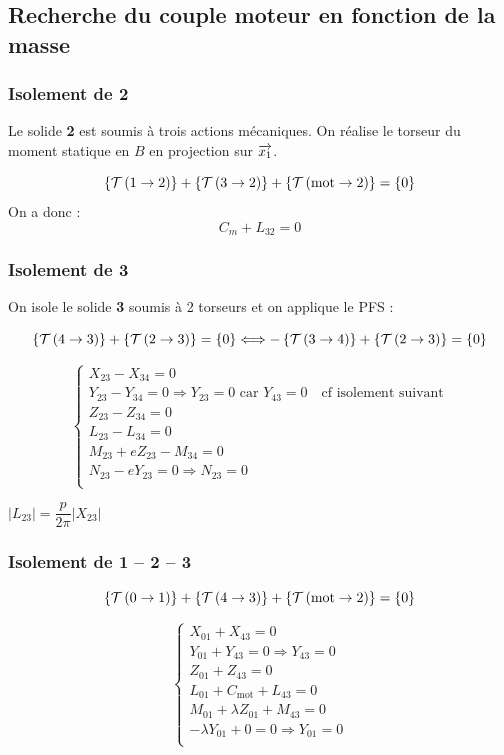 \documentclass[10pt,fleqn]{article} %
\begin{document}
\subsection{Recherche du couple moteur en fonction de la masse}
\subsubsection*{Isolement de 2}
Le solide \textbf{2} est soumis à trois actions mécaniques. On réalise le torseur du moment statique en $B$ en projection sur $\overrightarrow{x_1}$. 

$$
\left\{\mathcal{T} \left(1\rightarrow 2 \right) \right\} + \left\{\mathcal{T} \left(3\rightarrow 2 \right) \right\} + \left\{\mathcal{T} \left(\text{mot}\rightarrow 2 \right) \right\}  =\{0\} 
$$
On a donc : 
$$
C_m + L_{32}=0
$$





\subsubsection*{Isolement de 3}
On isole le solide \textbf{3} soumis à 2 torseurs et on applique le PFS :

$$
\left\{\mathcal{T} \left(4\rightarrow 3 \right) \right\} + \left\{\mathcal{T} \left(2\rightarrow 3 \right) \right\} =\{0\} \Longleftrightarrow 
-\left\{\mathcal{T} \left(3\rightarrow 4 \right) \right\} + \left\{\mathcal{T} \left(2\rightarrow 3 \right) \right\} =\{0\} 
$$

$$
\left\{
\begin{array}{l}
X_{23} - X_{34}=0\\
Y_{23} - Y_{34}=0 \Rightarrow  Y_{23} = 0 \text{ car } Y_{43} = 0 \quad \text{cf isolement suivant}\\
Z_{23} - Z_{34}=0\\
L_{23} - L_{34}=0\\
M_{23}+eZ_{23} - M_{34} =0\\
N_{23}-eY_{23} =0 \Rightarrow  N_{23} = 0 \\
\end{array}
\right.
$$

$|L_{23}|=\dfrac{p}{2\pi}|X_{23}|$


\subsubsection*{Isolement de 1 -- 2 -- 3}

$$
\left\{\mathcal{T} \left(0\rightarrow 1 \right) \right\}+\left\{\mathcal{T} \left(4\rightarrow 3 \right) \right\}+\left\{\mathcal{T} \left(\text{mot}\rightarrow 2 \right) \right\} = \{0\}
$$


$$
\left\{
\begin{array}{l}
X_{01} +  X_{43}= 0\\
Y_{01} + Y_{43} = 0 \Rightarrow  Y_{43} = 0  \\
Z_{01} + Z_{43} = 0\\
L_{01} + C_{\text{mot}} + L_{43} = 0\\
M_{01}+\lambda Z_{01} + M_{43} = 0\\
-\lambda Y_{01}  + 0= 0 \Rightarrow Y_{01} = 0\\
\end{array}
\right.
$$
\end{document}
